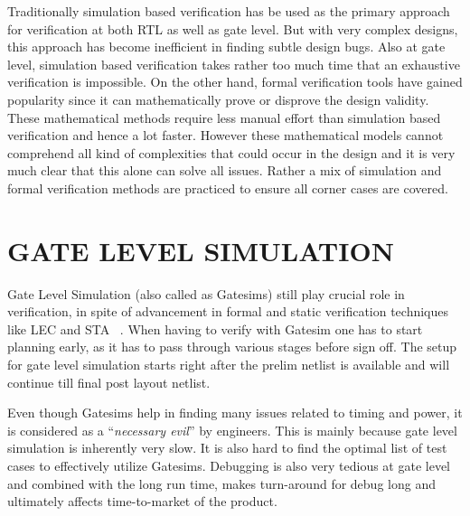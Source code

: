  Traditionally simulation based verification has be used as the primary approach for verification at both RTL as well as gate level.  But with very complex designs, this approach has become inefficient in finding subtle design bugs. Also at gate level, simulation based verification takes rather too much time that an exhaustive verification is impossible. On the other hand, formal verification tools have gained popularity since it can mathematically prove or disprove the design validity. These mathematical methods require less manual effort than simulation based verification and hence a lot faster. However these mathematical models cannot comprehend all kind of complexities that could occur in the design and it is very much clear that this alone can solve all issues. Rather a mix of simulation and formal verification methods are practiced to ensure all corner cases are covered. 


\section{GATE LEVEL SIMULATION}

Gate Level Simulation (also called as Gatesims) still play crucial role in verification, in spite of advancement in formal and static verification techniques like LEC  and STA ~\citep{ieee:segev:2004}.   When having to verify with Gatesim one has to start planning early, as it has to pass through various stages before sign off. The setup for gate level simulation starts right after the prelim netlist is available and will continue till final post layout netlist.  

Even though Gatesims help in finding many issues related to timing and power, it is considered as a ``{\it necessary evil}'' by engineers. This is mainly because gate level simulation is inherently very slow. It is also hard to find the optimal list of test cases to effectively utilize Gatesims. Debugging is also very tedious at gate level and combined with the long run time, makes turn-around for debug long and ultimately affects time-to-market of the product.

